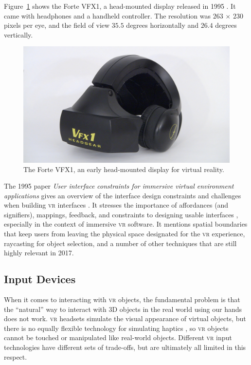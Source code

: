 \documentclass[nobib]{tufte-book} %
\begin{document}
Figure~\ref{fig:forte} shows the Forte VFX1, a head-mounted display released in 1995 \cite{fortevfx1}. It came with headphones and a handheld controller. The resolution was $263$ $\times$ $230$ pixels per eye, and the field of view $35.5$ degrees horizontally and $26.4$ degrees vertically.

\begin{figure}
  \includegraphics{forte-vfx1.jpg}
  \caption{The Forte VFX1, an early head-mounted display for virtual reality.}
  \label{fig:forte}
\end{figure}

The 1995 paper \emph{User interface constraints for immersive virtual environment applications} gives an overview of the interface design constraints and challenges when building \textsc{vr} interfaces \cite{bowman1995user}. It stresses the importance of affordances (and signifiers), mappings, feedback, and constraints to designing usable interfaces \cite{norman2013design}, especially in the context of immersive \textsc{vr} software. It mentions spatial boundaries that keep users from leaving the physical space designated for the \textsc{vr} experience, raycasting for object selection, and a number of other techniques that are still highly relevant in 2017.

\subsection{Input Devices}
When it comes to interacting with \textsc{vr} objects, the fundamental problem is that the ``natural'' way to interact with 3D objects in the real world using our hands does not work. \textsc{vr} headsets simulate the visual appearance of virtual objects, but there is no equally flexible technology for simulating haptics \cite{burdea1999keynote}, so \textsc{vr} objects cannot be touched or manipulated like real-world objects. Different \textsc{vr} input technologies have different sets of trade-offs, but are ultimately all limited in this respect.
\end{document}

